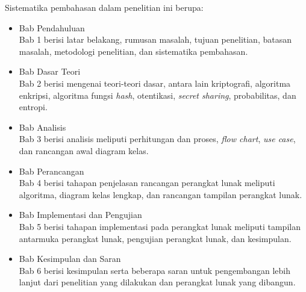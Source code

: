 Sistematika pembahasan dalam penelitian ini berupa:
\begin{itemize}
	\item Bab Pendahuluan
	\\Bab 1 berisi latar belakang, rumusan masalah, tujuan penelitian, batasan masalah, metodologi penelitian, dan sistematika pembahasan.
	\item Bab Dasar Teori
	\\Bab 2 berisi mengenai teori-teori dasar, antara lain kriptografi, algoritma enkripsi, algoritma fungsi \textit{hash}, otentikasi, \textit{secret sharing}, probabilitas, dan entropi.
	\item Bab Analisis
	\\Bab 3 berisi analisis meliputi perhitungan dan proses, \textit{flow chart}, \textit{use case}, dan rancangan awal diagram kelas.
	\item Bab Perancangan
	\\Bab 4 berisi tahapan penjelasan rancangan perangkat lunak meliputi algoritma, diagram kelas lengkap, dan rancangan tampilan perangkat lunak.
	\item Bab Implementasi dan Pengujian
	\\Bab 5 berisi tahapan implementasi pada perangkat lunak meliputi tampilan antarmuka perangkat lunak, pengujian perangkat lunak, dan kesimpulan.
	\item Bab Kesimpulan dan Saran
	\\Bab 6 berisi kesimpulan serta beberapa saran untuk pengembangan lebih lanjut dari penelitian yang dilakukan dan perangkat lunak yang dibangun.
\end{itemize}